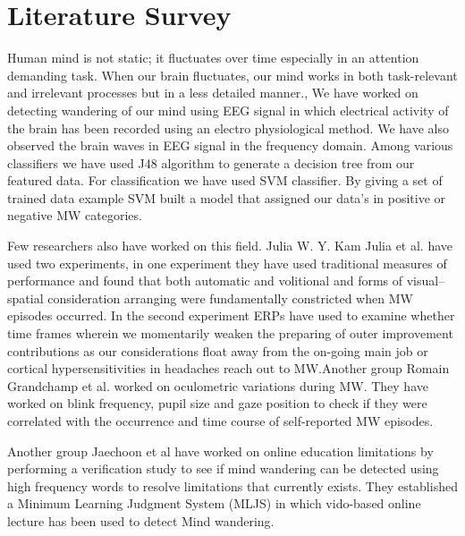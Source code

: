 
\chapter{Literature Survey} %

\label{Chapter2} %

Human mind is not static; it fluctuates over time especially in an attention demanding task. When our brain fluctuates, our mind works in both task-relevant and irrelevant processes but in a less detailed manner.\cite{grandchamp2014oculometric}, We have worked on detecting wandering of our mind using EEG signal in which electrical activity of the brain has been recorded using an electro physiological method. We have also observed the brain waves in EEG signal in the frequency domain. Among various classifiers we have used J48 algorithm to generate a decision tree from our featured data. For classification we have used SVM classifier. By giving a set of trained data example SVM built a model that assigned our data’s in positive or negative MW categories. 

Few researchers also have worked on this field. Julia W. Y. Kam Julia et al. \cite{kam2013mind} have used two experiments, in one experiment they have used traditional measures of performance  and found that both automatic and volitional and  forms of visual–spatial consideration arranging were fundamentally constricted when MW episodes occurred. In the second experiment ERPs have used to examine whether time frames wherein we momentarily weaken the preparing of outer improvement contributions as our considerations float away from the on-going main job or cortical hypersensitivities in headaches reach out to MW.Another group Romain Grandchamp et al. \cite{grandchamp2014oculometric} worked on oculometric variations during MW. They have worked on blink frequency, pupil size and gaze position to check if they were correlated with the occurrence and time course of self-reported MW episodes. 

Another group Jaechoon et al have worked on online education limitations by performing a verification study to see if  mind wandering can be detected using high frequency words to resolve limitations that currently exists. They established a Minimum Learning Judgment System (MLJS) in which vido-based online lecture has been used to detect Mind wandering. 

